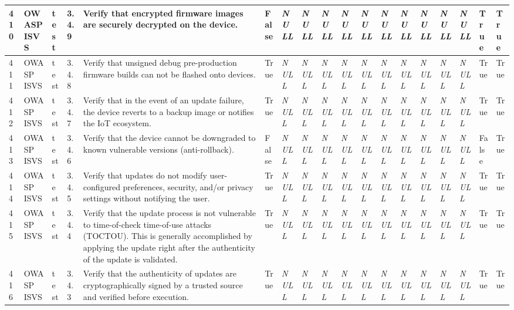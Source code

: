 \begin{longtable}{|l|l|l|l|l|l|l|l|l|l|l|l|l|l|l|l|l|l|}
410 & OWASP ISVS & test & 3.4.9 & Verify that encrypted firmware images are securely decrypted on the device. & False & \textit{NULL} & \textit{NULL} & \textit{NULL} & \textit{NULL} & \textit{NULL} & \textit{NULL} & \textit{NULL} & \textit{NULL} & \textit{NULL} & \textit{NULL} & True & True \\ \hline 
411 & OWASP ISVS & test & 3.4.8 & Verify that unsigned debug pre-production firmware builds can not be flashed onto devices. & True & \textit{NULL} & \textit{NULL} & \textit{NULL} & \textit{NULL} & \textit{NULL} & \textit{NULL} & \textit{NULL} & \textit{NULL} & \textit{NULL} & \textit{NULL} & True & True \\ \hline 
412 & OWASP ISVS & test & 3.4.7 & Verify that in the event of an update failure, the device reverts to a backup image or notifies the IoT ecosystem. & True & \textit{NULL} & \textit{NULL} & \textit{NULL} & \textit{NULL} & \textit{NULL} & \textit{NULL} & \textit{NULL} & \textit{NULL} & \textit{NULL} & \textit{NULL} & True & True \\ \hline 
413 & OWASP ISVS & test & 3.4.6 & Verify that the device cannot be downgraded to known vulnerable versions (anti-rollback). & False & \textit{NULL} & \textit{NULL} & \textit{NULL} & \textit{NULL} & \textit{NULL} & \textit{NULL} & \textit{NULL} & \textit{NULL} & \textit{NULL} & \textit{NULL} & False & True \\ \hline 
414 & OWASP ISVS & test & 3.4.5 & Verify that updates do not modify user-configured preferences, security, and/or privacy settings without notifying the user. & True & \textit{NULL} & \textit{NULL} & \textit{NULL} & \textit{NULL} & \textit{NULL} & \textit{NULL} & \textit{NULL} & \textit{NULL} & \textit{NULL} & \textit{NULL} & True & True \\ \hline 
415 & OWASP ISVS & test & 3.4.4 & Verify that the update process is not vulnerable to time-of-check time-of-use attacks (TOCTOU). This is generally accomplished by applying the update right after the authenticity of the update is validated. & True & \textit{NULL} & \textit{NULL} & \textit{NULL} & \textit{NULL} & \textit{NULL} & \textit{NULL} & \textit{NULL} & \textit{NULL} & \textit{NULL} & \textit{NULL} & True & True \\ \hline 
416 & OWASP ISVS & test & 3.4.3 & Verify that the authenticity of updates are cryptographically signed by a trusted source and verified before execution. & True & \textit{NULL} & \textit{NULL} & \textit{NULL} & \textit{NULL} & \textit{NULL} & \textit{NULL} & \textit{NULL} & \textit{NULL} & \textit{NULL} & \textit{NULL} & True & True \\ \hline 

\end{longtable}
